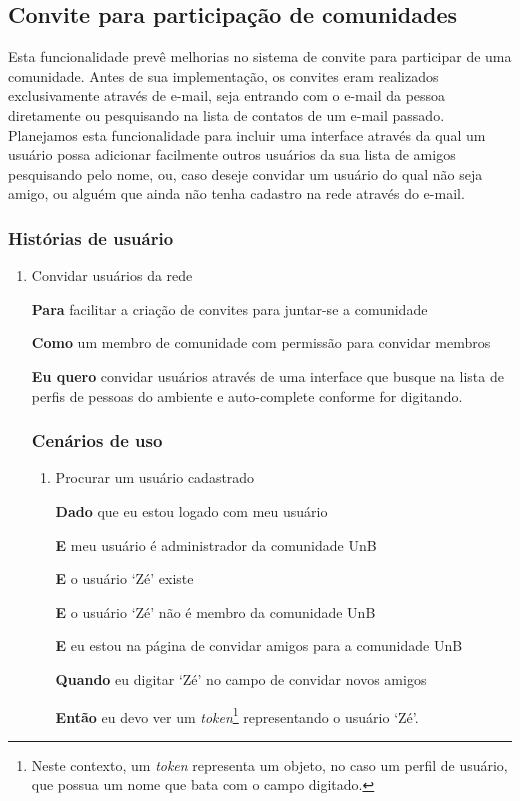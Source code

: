 \subsection{Convite para participação de comunidades}

Esta funcionalidade prevê melhorias no sistema de convite para participar de
uma comunidade. Antes de sua implementação, os convites eram realizados
exclusivamente através de e-mail, seja entrando com o e-mail da pessoa
diretamente ou pesquisando na lista de contatos de um e-mail passado. Planejamos
esta funcionalidade para incluir uma interface através da qual um usuário
possa adicionar facilmente outros usuários da sua lista de amigos pesquisando
pelo nome, ou, caso deseje convidar um usuário do qual não seja amigo, ou alguém
que ainda não tenha cadastro na rede através do e-mail.

\subsubsection*{Histórias de usuário}

\begin{enumerate}

\item Convidar usuários da rede

\textbf{Para} facilitar a criação de convites para juntar-se a comunidade

\textbf{Como} um membro de comunidade com permissão para convidar membros

\textbf{Eu quero} convidar usuários através de uma interface que busque na lista
de perfis de pessoas do ambiente e auto-complete conforme for digitando.

\subsubsection*{Cenários de uso}

\begin{enumerate}

\item Procurar um usuário cadastrado

\textbf{Dado} que eu estou logado com meu usuário

\textbf{E} meu usuário é administrador da comunidade UnB

\textbf{E} o usuário `Zé' existe

\textbf{E} o usuário `Zé' não é membro da comunidade UnB

\textbf{E} eu estou na página de convidar amigos para a comunidade UnB

\textbf{Quando} eu digitar `Zé' no campo de convidar novos amigos

\textbf{Então} eu devo ver um \textit{token}\footnote{Neste contexto, um
\textit{token} representa um objeto, no caso um perfil de usuário, que possua
um nome que bata com o campo digitado.} representando o usuário `Zé'.

\end{enumerate}

\end{enumerate}
